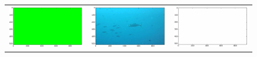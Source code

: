 \begin{figure}
\begin{tabular}{ccc}
\includegraphics[keepaspectratio=true,width=\segwidth]{images/segment/5053_10__animals__.png} &
\includegraphics[keepaspectratio=true,width=\segwidth]{images/segment/5053_10__image__.png} &
\includegraphics[keepaspectratio=true,width=\segwidth]{images/segment/5053_10__plastic__.png} \\


\end{tabular}
\end{figure}
